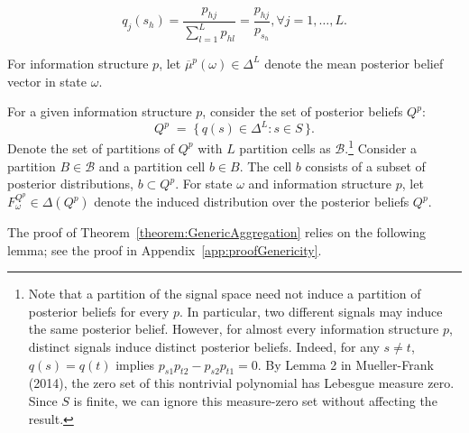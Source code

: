 \documentclass[12pt,reqno]{amsart}
\begin{document}
\[
q_j(s_h) = \frac{p_{hj}}{\sum_{l=1}^L p_{hl}} = \frac{p_{hj}}{p_{s_h}}, \forall j = 1, \ldots, L.
\]

For information structure $p$, let $\overline{\mu}^p(\omega)\in \Delta^L$ denote the mean posterior belief vector in state $\omega$. 

For a given information structure $p$, consider the set of posterior beliefs $Q^p$:
\[
  Q^p \;=\; \{\, q(s)\in \Delta^L : s\in S \,\}.
\]
Denote the set of partitions of $Q^p$ with $L$ partition cells as $\mathcal{B}$.\footnote{Note that a partition of the signal space need not induce a partition of posterior beliefs for every \(p\). In particular, two different signals may induce the same posterior belief. However, for almost every information structure \(p\), distinct signals induce distinct posterior beliefs. Indeed, for any \(s\neq t\), \(q(s)=q(t)\) implies \(p_{s1}p_{t2}-p_{s2}p_{t1}=0\). By Lemma 2 in Mueller-Frank (2014), the zero set of this nontrivial polynomial has Lebesgue measure zero. Since \(S\) is finite, we can ignore this measure-zero set without affecting the result.} Consider a partition $B\in \mathcal{B}$ and a partition cell $b\in B$. The cell $b$ consists of a subset of posterior distributions, $b \subset Q^p$. For state $\omega$ and information structure $p$, let $F_\omega^{Q^p} \in \Delta(Q^p)$ denote the induced distribution over the posterior beliefs $Q^p$.

The proof of Theorem~\ref{theorem:GenericAggregation} relies on the following lemma; see the proof in Appendix~\ref{app:proofGenericity}.
\end{document}
